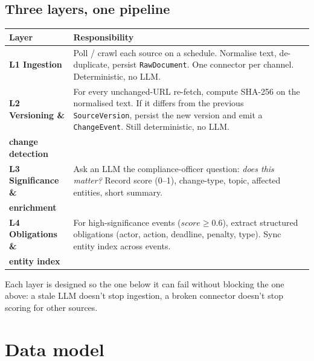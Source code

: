 \documentclass[11pt,a4paper]{article}
\begin{document}
\subsection{Three layers, one pipeline}

\begin{center}
\small
\begin{tabularx}{\linewidth}{@{}lX@{}}
\toprule
\textbf{Layer} & \textbf{Responsibility} \\
\midrule
\textbf{L1 Ingestion} &
Poll / crawl each source on a schedule. Normalise text,
de-duplicate, persist \texttt{RawDocument}. One connector per
channel. Deterministic, no LLM. \\
\textbf{L2 Versioning \&} &
For every unchanged-URL re-fetch, compute SHA-256 on the
normalised text. If it differs from the previous
\texttt{SourceVersion}, persist the new version and emit a
\texttt{ChangeEvent}. Still deterministic, no LLM. \\
\textbf{change detection} & \\
\textbf{L3 Significance \&} &
Ask an LLM the compliance-officer question: \textit{does this
matter?} Record score (0--1), change-type, topic,
affected entities, short summary. \\
\textbf{enrichment} & \\
\textbf{L4 Obligations \&} &
For high-significance events ($score \geq 0.6$), extract
structured obligations (actor, action, deadline, penalty,
type). Sync entity index across events. \\
\textbf{entity index} & \\
\bottomrule
\end{tabularx}
\end{center}

Each layer is designed so the one below it can fail without blocking
the one above: a stale LLM doesn't stop ingestion, a broken
connector doesn't stop scoring for other sources.

\section{Data model}
\end{document}
